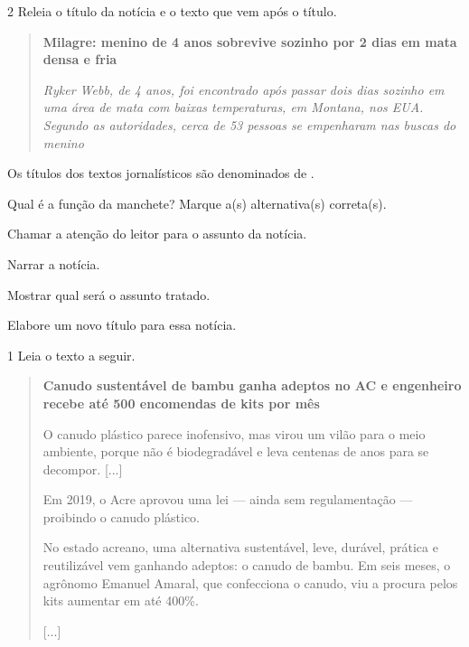 \num{2} Releia o título da notícia e o texto que vem após o título.

\begin{quote}
\textbf{Milagre: menino de 4 anos sobrevive sozinho por 2 dias em mata densa e fria}

\emph{Ryker Webb, de 4 anos, foi encontrado após passar dois dias
sozinho em uma área de mata com baixas temperaturas, em Montana, nos
EUA. Segundo as autoridades, cerca de 53 pessoas se empenharam nas
buscas do menino}
\end{quote}

\begin{escolha}
\item Os títulos dos textos jornalísticos são denominados de .

\item Qual é a função da manchete? Marque a(s) alternativa(s) correta(s).

\begin{boxlist}
\boxitem[\rosa{X}] Chamar a atenção do leitor para o assunto da notícia.

\boxitem[] Narrar a notícia.

\boxitem[\rosa{X}] Mostrar qual será o assunto tratado.
\end{boxlist}

\item Elabore um novo título para essa notícia.

\end{escolha}


\num{1} Leia o texto a seguir.

\begin{quote}
\textbf{Canudo sustentável de bambu ganha adeptos no AC e engenheiro
recebe até 500 encomendas de kits por mês}

O canudo plástico parece inofensivo, mas virou um vilão para o meio
ambiente, porque não é biodegradável e leva centenas de anos para se
decompor. {[}...{]}

Em 2019, o Acre aprovou uma lei --- ainda sem regulamentação ---
proibindo o canudo plástico.

No estado acreano, uma alternativa sustentável, leve, durável, prática e
reutilizável vem ganhando adeptos: o canudo de bambu. Em seis meses, o
agrônomo Emanuel Amaral, que confecciona o canudo, viu a procura pelos
kits aumentar em até 400\%.

{[}...{]}
\end{quote}

